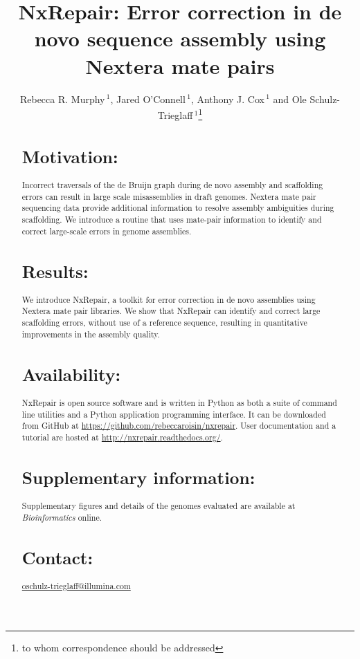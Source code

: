 \documentclass{bioinfo}
\begin{document}

\title[NxRepair]{NxRepair: Error correction in de novo sequence assembly using Nextera mate pairs}
\author[Murphy \textit{et~al}]{Rebecca R. Murphy\,$^{1}$, Jared O'Connell\,$^{1}$, Anthony J. Cox\,$^{1}$ and Ole Schulz-Trieglaff\,$^{1}$\footnote{to whom correspondence should be addressed}}
\address{$^{1}$Illumina Cambridge, Chesterford Research Park, Essex, CB10 1XL}



\maketitle

\begin{abstract}

\section{Motivation:}
Incorrect traversals of the de Bruijn graph during de novo assembly and scaffolding errors can result in large scale misassemblies in draft genomes. Nextera mate pair sequencing data provide additional information to resolve assembly ambiguities during scaffolding. We introduce a routine that uses mate-pair information to identify and correct large-scale errors in genome assemblies.    
\section{Results:}
We introduce NxRepair, a toolkit for error correction in de novo assemblies using Nextera mate pair libraries. We show that NxRepair can identify and correct large scaffolding errors, without use of a reference sequence, resulting in quantitative improvements in the assembly quality.
\section{Availability:}
NxRepair is open source software and is written in Python as both a suite of command line utilities and a Python application programming interface. It can be downloaded from GitHub at \href{https://github.com/rebeccaroisin/nxrepair}{https://github.com/rebeccaroisin/nxrepair}. User documentation and a tutorial are hosted at \href{http://nxrepair.readthedocs.org/}{http://nxrepair.readthedocs.org/}.
\section{Supplementary information:}
Supplementary figures and details of the genomes evaluated are available at \emph{Bioinformatics} online. 
\section{Contact:} \href{oschulz-trieglaff@illumina.com}{oschulz-trieglaff@illumina.com}
\end{abstract}
\end{document}
